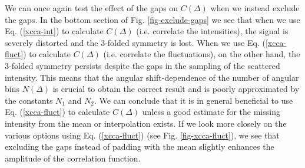 \documentclass[12pt]{article}
\begin{document}
We can once again test the effect of the gaps on $C(\Delta)$ when we instead exclude the gaps. In the bottom section of Fig. \ref{fig-exclude-gaps} we see that when we use Eq. (\ref{xcca-int}) to calculate $C(\Delta)$ (i.e. correlate the intensities), the signal is severely distorted and the 3-folded symmetry is lost. When we use Eq. (\ref{xcca-fluct}) to calculate $C(\Delta)$ (i.e. correlate the fluctuations), on the other hand, the 3-folded symmetry persists despite the gaps in the sampling of the scattered intensity. This means that the angular shift-dependence of the number of angular bins $N(\Delta)$ is crucial to obtain the correct result and is poorly approximated by the constants $N_1$ and $N_2$. We can conclude that it is in general beneficial to use Eq. (\ref{xcca-fluct}) to calculate $C(\Delta)$ unless a good estimate for the missing intensity from the mean or interpolation exists. If we look more closely on the various options using Eq. (\ref{xcca-fluct}) (see Fig. \ref{fig-xcca-fluct}), we see that excluding the gaps instead of padding with the mean slightly enhances the amplitude of the correlation function.
\end{document}
